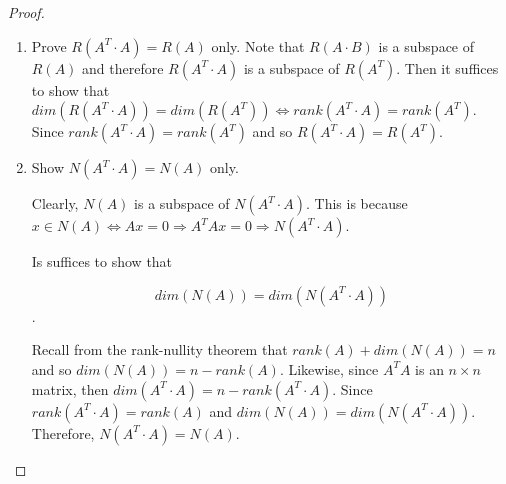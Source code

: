 \documentclass[12pt]{article}
\theoremstyle{definition}
\begin{document}
\begin{proof} $ $
\begin{enumerate}[label = (\arabic*)]
\item Prove $R(A^T \cdot A) = R(A)$ only. Note that $R(A \cdot B)$ is a subspace
of $R(A)$ and therefore $R(A^T \cdot A)$ is a subspace of $R(A^T)$. Then it
suffices to show that $dim(R(A^T \cdot A)) = dim(R(A^T)) \iff rank(A^T \cdot A) = rank(A^T)$.
Since $rank(A^T \cdot A) = rank(A^T)$ and so $R(A^T \cdot A) = R(A^T)$.

\item Show $N(A^T \cdot A) = N(A)$ only.

Clearly, $N(A)$ is a subspace of $N(A^T \cdot A)$. This is because $x \in N(A) \iff Ax = 0
\Rightarrow A^T Ax = 0 \Rightarrow N(A^T \cdot A)$.

Is suffices to show that

\[ dim(N(A)) = dim(N(A^T \cdot A)) \].

Recall from the rank-nullity theorem that $rank(A) + dim(N(A)) = n$ and so
$dim(N(A)) = n - rank(A)$. Likewise, since $A^T A$ is an $n \times n$ matrix,
then $dim(A^T \cdot A) = n - rank(A^T \cdot A)$. Since 
$rank(A^T \cdot A) = rank(A)$ and $dim(N(A)) = dim(N(A^T \cdot A))$. Therefore,
$N(A^T \cdot A) = N(A)$.
\end{enumerate}
\end{proof}
\end{document}
